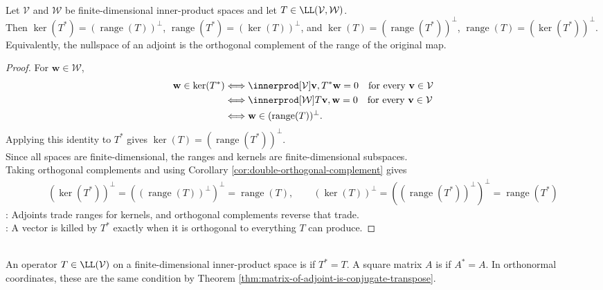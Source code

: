 \begin{proposition} \label{prop:adjoint-kernel-range-orthogonality} \\
Let $\mathcal{V}$ and $\mathcal{W}$ be finite-dimensional inner-product spaces and let $T\in\LL(\mathcal{V},\mathcal{W})$.\\
Then $\ker(T^*)=(\operatorname{range}(T))^{\perp}$, $\operatorname{range}(T^*)=(\ker(T))^{\perp}$, and $\ker(T)=(\operatorname{range}(T^*))^{\perp}$, $\operatorname{range}(T)=(\ker(T^*))^{\perp}$.\\
Equivalently, the nullspace of an adjoint is the orthogonal complement of the range of the original map.
\begin{proof}
For $\mathbf{w}\in\mathcal{W}$,
\begin{align}
\mathbf{w}\in\ker(T^*)
&\Longleftrightarrow \innerprod[\mathcal{V}]{\mathbf{v},T^*\mathbf{w}}=0\quad\text{for every }\mathbf{v}\in\mathcal{V} \nonumber\\
&\Longleftrightarrow \innerprod[\mathcal{W}]{T\mathbf{v},\mathbf{w}}=0\quad\text{for every }\mathbf{v}\in\mathcal{V} \nonumber\\
&\Longleftrightarrow \mathbf{w}\in(\operatorname{range}(T))^{\perp}.
\nonumber
\end{align}
Applying this identity to $T^*$ gives $\ker(T)=(\operatorname{range}(T^*))^{\perp}$.\\
Since all spaces are finite-dimensional, the ranges and kernels are finite-dimensional subspaces.\\
Taking orthogonal complements and using Corollary \ref{cor:double-orthogonal-complement} gives
\begin{align}
(\ker(T^*))^{\perp}=((\operatorname{range}(T))^{\perp})^{\perp}=\operatorname{range}(T),
\qquad
(\ker(T))^{\perp}=((\operatorname{range}(T^*))^{\perp})^{\perp}=\operatorname{range}(T^*) \nonumber
\end{align}
: Adjoints trade ranges for kernels, and orthogonal complements reverse that trade.\\
: A vector is killed by $T^*$ exactly when it is orthogonal to everything $T$ can produce.
\end{proof}
\end{proposition}

\begin{definition} \label{def:self-adjoint-hermitian} \\
An operator $T\in\LL(\mathcal{V})$ on a finite-dimensional inner-product space is  if $T^*=T$. A square matrix $A$ is  if $A^*=A$. In orthonormal coordinates, these are the same condition by Theorem \ref{thm:matrix-of-adjoint-is-conjugate-transpose}.
\end{definition}

